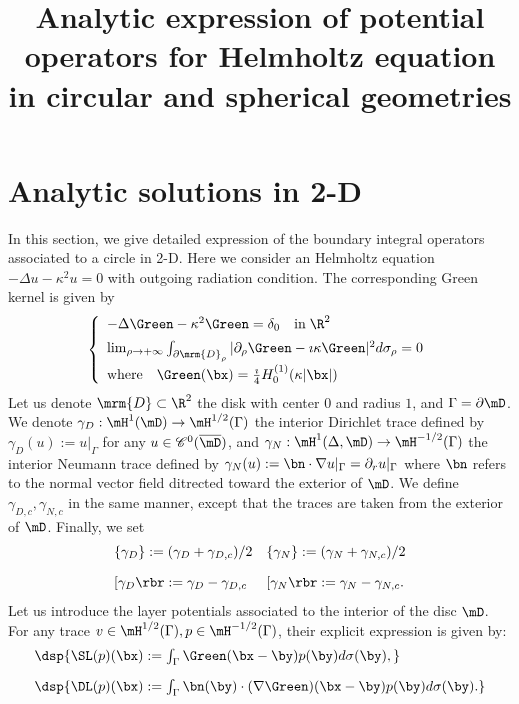\documentclass[a4paper,11pt]{article}
\date{}
\title{Analytic expression of potential operators for Helmholtz equation in circular and spherical geometries}
\begin{document}
\maketitle


\section*{Analytic solutions in 2-D}

In this section, we give detailed expression of the boundary integral operators associated to a circle in 2-D. 
Here we consider an Helmholtz equation   $-\Delta u -\kappa^{2}u = 0$ with outgoing radiation condition.
The corresponding Green kernel is given by
$$
\left\{\begin{array}{l}
-\Delta \Green - \kappa^{2}\Green = \delta_{0}\quad\textrm{in}\;\R^{2}\\[5pt]
\lim_{\rho\to +\infty}\int_{\partial\mrm{D}_{\rho}}\vert \partial_{\rho}\Green - \imath\kappa \Green\vert^{2}d\sigma_{\rho} = 0\\[5pt]
\textrm{where}\quad  \Green(\bx) = \frac{\imath}{4}H_{0}^{(1)}(\kappa\vert \bx\vert)
\end{array}\right.
$$
Let us denote $\mrm{D}\subset\R^{2}$ the disk with center $0$ and radius $1$, and $\Gamma = \partial\mD$. 
We denote $\gamma_{D}:\mH^{1}(\mD)\to \mH^{1/2}(\Gamma)$ the interior Dirichlet trace defined by $\gamma_{D}(u):= u\vert_{\Gamma}$
for any $u\in \mathscr{C}^{0}(\overline{\mD})$, and  $\gamma_{N}:\mH^{1}(\Delta,\mD)\to \mH^{-1/2}(\Gamma)$ the interior 
Neumann trace defined by $\gamma_{N}(u) := \bn\cdot\nabla u\vert_{\Gamma} = \partial_{r}u\vert_{\Gamma}$ where $\bn$ refers to 
the normal vector field ditrected toward the exterior of $\mD$. We define $\gamma_{D,c},\gamma_{N,c}$ in the 
same manner, except that the traces are taken from the exterior of $\mD$. Finally, we set 
$$
\begin{array}{ll}
\{\gamma_{D}\}:= (\gamma_{D}+\gamma_{D,c})/2 &  \{\gamma_{N}\}:= (\gamma_{N}+\gamma_{N,c})/2\\[10pt]
\lbrack\gamma_{D}\rbr:=\gamma_{D}-\gamma_{D,c} & \lbrack\gamma_{N}\rbr:=\gamma_{N}-\gamma_{N,c}.
\end{array}
$$
Let us introduce the layer potentials associated to the interior of the disc $\mD$. 
For any trace $v\in\mH^{1/2}(\Gamma), p\in\mH^{-1/2}(\Gamma)$, their explicit expression 
is given by:
\begin{equation}\label{PotentialOperators}
\begin{array}{l}
\dsp{ \SL(p)(\bx):=\int_{\Gamma}\Green(\bx-\by)p(\by) d\sigma(\by), }\\[10pt]
\dsp{ \DL(p)(\bx):=\int_{\Gamma}\bn(\by)\cdot(\nabla\Green)(\bx-\by)p(\by) d\sigma(\by). }
\end{array}
\end{equation}
\end{document}
